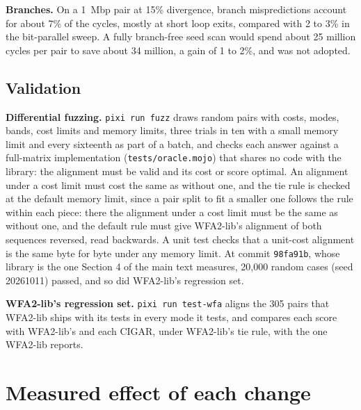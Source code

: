 \documentclass[10pt]{article}
\begin{document}
\textbf{Branches.} On a 1~Mbp pair at 15\% divergence, branch mispredictions account for about 7\% of the cycles, mostly at short loop exits, compared with 2 to 3\% in the bit-parallel sweep. A fully branch-free seed scan would spend about 25 million cycles per pair to save about 34 million, a gain of 1 to 2\%, and was not adopted.

\subsection{Validation}

\textbf{Differential fuzzing.} \texttt{pixi run fuzz} draws random pairs with costs, modes, bands, cost limits and memory limits, three trials in ten with a small memory limit and every sixteenth as part of a batch, and checks each answer against a full-matrix implementation (\texttt{tests/oracle.mojo}) that shares no code with the library: the alignment must be valid and its cost or score optimal. An alignment under a cost limit must cost the same as without one, and the tie rule is checked at the default memory limit, since a pair split to fit a smaller one follows the rule within each piece: there the alignment under a cost limit must be the same as without one, and the default rule must give WFA2-lib's alignment of both sequences reversed, read backwards. A unit test checks that a unit-cost alignment is the same byte for byte under any memory limit. At commit \texttt{98fa91b}, whose library is the one Section 4 of the main text measures, 20{,}000 random cases (seed 20261011) passed, and so did WFA2-lib's regression set.

\textbf{WFA2-lib's regression set.} \texttt{pixi run test-wfa} aligns the 305 pairs that WFA2-lib ships with its tests in every mode it tests, and compares each score with WFA2-lib's and each CIGAR, under WFA2-lib's tie rule, with the one WFA2-lib reports.

\section{Measured effect of each change}
\end{document}
